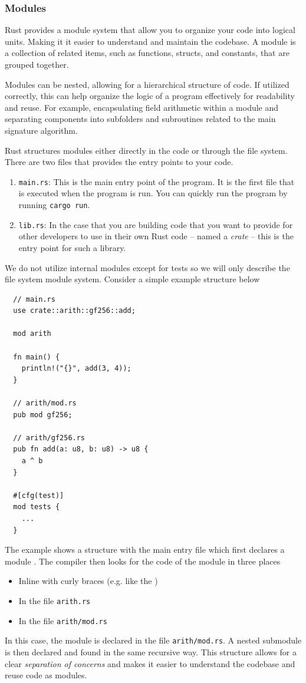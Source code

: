 \documentclass[11pt]{report}
\theoremstyle{definition}
\theoremstyle{plain}
\begin{document}
\subsubsection{Modules}\label{sub:rust_modules}
Rust provides a module system that allow you to organize your code into logical units. Making it it easier to understand and maintain the codebase. A module is a collection of related items, such as functions, structs, and constants, that are grouped together.

Modules can be nested, allowing for a hierarchical structure of code.
If utilized correctly, this can help organize the logic of a program effectively for readability and reuse. For example, encapsulating field arithmetic within a module and separating components into subfolders and subroutines related to the main signature algorithm.

Rust structures modules either directly in the code or through the file system. There are two files that provides the entry points to your code.
\begin{enumerate}
  \item \texttt{main.rs}: This is the main entry point of the program. It is the first file that is executed when the program is run. You can quickly run the program by running \texttt{cargo run}.
  \item \texttt{lib.rs}: In the case that you are building code that you want to provide for other developers to use in their own Rust code -- named a \textit{crate} -- this is the entry point for such a library.
\end{enumerate}
We do not utilize internal modules except for tests so we will only describe the file system module system. Consider a simple example structure below
\begin{verbatim}
  // main.rs
  use crate::arith::gf256::add;

  mod arith

  fn main() {
    println!("{}", add(3, 4));
  }

  // arith/mod.rs
  pub mod gf256;

  // arith/gf256.rs
  pub fn add(a: u8, b: u8) -> u8 {
    a ^ b
  }

  #[cfg(test)]
  mod tests {
    ...
  }
\end{verbatim}
The example shows a structure with the main entry file which first declares a module . The compiler then looks for the code of the module in three places
\begin{itemize}[parsep=0pt, itemsep=0pt]
  \item Inline with curly braces (e.g. like the )
  \item In the file \texttt{arith.rs}
  \item In the file \texttt{arith/mod.rs}
\end{itemize}
In this case, the module  is declared in the file \texttt{arith/mod.rs}. A nested submodule  is then declared and found in the same recursive way. This structure allows for a clear \textit{separation of concerns} and makes it easier to understand the codebase and reuse code as modules.
\end{document}
